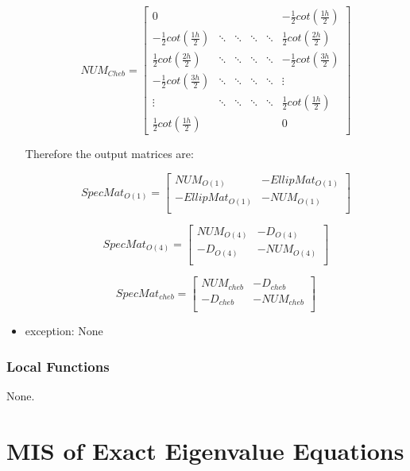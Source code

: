 \documentclass[12pt, titlepage]{article}
\begin{document}
\begin{itemize}
\[
NUM_{Cheb}=
\begin{bmatrix}
0 & &  &  &   &-\frac{1}{2} cot(\frac{1h}{2})\\
-\frac{1}{2} cot(\frac{1h}{2}) & \ddots & \ddots & \ddots & \ddots   
&\frac{1}{2} cot(\frac{2h}{2})\\
\frac{1}{2} cot(\frac{2h}{2}) & \ddots & \ddots & \ddots & \ddots   
&-\frac{1}{2} cot(\frac{3h}{2})\\
-\frac{1}{2} cot(\frac{3h}{2}) & \ddots & \ddots & \ddots & \ddots   
&\vdots \\
\vdots & \ddots & \ddots & \ddots & \ddots   &\frac{1}{2} cot(\frac{1h}{2})\\
\frac{1}{2} cot(\frac{1h}{2}) &  & &  &    & 0  
\end{bmatrix}
\]  

Therefore the output matrices are: 

 \[
SpecMat_{O(1)}=
\left[ {\begin{array}{cc}
	NUM_{O(1)} & -EllipMat_{O(1)} \\
	-EllipMat_{O(1)} & -NUM_{O(1)} \\
	\end{array} } \right]
\] 

 \[
SpecMat_{O(4)}=
\left[ {\begin{array}{cc}
	NUM_{O(4)} & -D_{O(4)} \\
	-D_{O(4)} & -NUM_{O(4)} \\
	\end{array} } \right]
\] 

 \[
SpecMat_{cheb}=
\left[ {\begin{array}{cc}
	NUM_{cheb} & -D_{cheb} \\
	-D_{cheb} & -NUM_{cheb} \\
	\end{array} } \right]
\] 

	\item exception: None
\end{itemize}

\subsubsection{Local Functions} 

None. 

\newpage

\section{MIS of Exact Eigenvalue Equations} \label{SEE}
\end{document}
